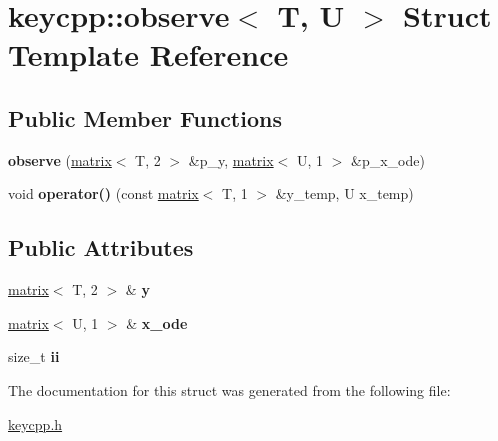 \hypertarget{structkeycpp_1_1observe}{\section{keycpp\-:\-:observe$<$ T, U $>$ Struct Template Reference}
\label{structkeycpp_1_1observe}
}
\subsection*{Public Member Functions}
\begin{DoxyCompactItemize}
\item 
\hypertarget{structkeycpp_1_1observe_af1f4dd52d947ffc2a3943a71dde5392e}{{\bfseries observe} (\hyperlink{classkeycpp_1_1matrix}{matrix}$<$ T, 2 $>$ \&p\-\_\-y, \hyperlink{classkeycpp_1_1matrix}{matrix}$<$ U, 1 $>$ \&p\-\_\-x\-\_\-ode)}\label{structkeycpp_1_1observe_af1f4dd52d947ffc2a3943a71dde5392e}

\item 
\hypertarget{structkeycpp_1_1observe_af50e6153473d58abe82d6baa44fc5ece}{void {\bfseries operator()} (const \hyperlink{classkeycpp_1_1matrix}{matrix}$<$ T, 1 $>$ \&y\-\_\-temp, U x\-\_\-temp)}\label{structkeycpp_1_1observe_af50e6153473d58abe82d6baa44fc5ece}

\end{DoxyCompactItemize}
\subsection*{Public Attributes}
\begin{DoxyCompactItemize}
\item 
\hypertarget{structkeycpp_1_1observe_ad06476e501cfc03b9b05badb312aaf15}{\hyperlink{classkeycpp_1_1matrix}{matrix}$<$ T, 2 $>$ \& {\bfseries y}}\label{structkeycpp_1_1observe_ad06476e501cfc03b9b05badb312aaf15}

\item 
\hypertarget{structkeycpp_1_1observe_a332dd43fe9cab832a79f8b20eac2e118}{\hyperlink{classkeycpp_1_1matrix}{matrix}$<$ U, 1 $>$ \& {\bfseries x\-\_\-ode}}\label{structkeycpp_1_1observe_a332dd43fe9cab832a79f8b20eac2e118}

\item 
\hypertarget{structkeycpp_1_1observe_a26f43b79b19af889827df682270a4d57}{size\-\_\-t {\bfseries ii}}\label{structkeycpp_1_1observe_a26f43b79b19af889827df682270a4d57}

\end{DoxyCompactItemize}


The documentation for this struct was generated from the following file\-:\begin{DoxyCompactItemize}
\item 
\hyperlink{keycpp_8h}{keycpp.\-h}\end{DoxyCompactItemize}

